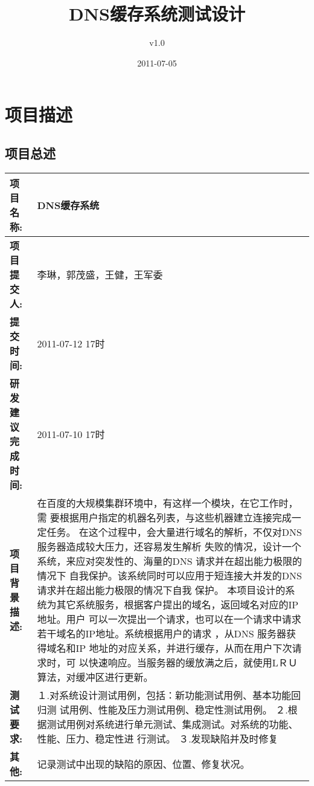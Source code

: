 \documentclass[12pt, a4paper, titlepage]{article}
\title{DNS缓存系统测试设计}
\author{v1.0}
\date{2011-07-05}
\begin{document}
\maketitle


\newpage
{}%


\tableofcontents
\newpage
{}

\section{项目描述}
\subsection{项目总述}
\begin{table}[H]
\centering
\begin{tabular}{|p{5em}|p{25em}|}
\hline
\textbf{项目名称:}&DNS缓存系统\\
\hline
\textbf{项目提交人:}&李琳，郭茂盛，王健，王军委\\
\hline
\textbf{提交时间:}& 2011-07-12 17时\\
\hline
\textbf{研发建议完成时间:}&2011-07-10 17时\\
\hline
\textbf{项目背景描述:}&{在百度的大规模集群环境中，有这样一个模块，在它工作时，需
要根据用户指定的机器名列表，与这些机器建立连接完成一定任务。
在这个过程中，会大量进行域名的解析，不仅对DNS 服务器造成较大压力，还容易发生解析
失败的情况，设计一个系统，来应对突发性的、海量的DNS 请求并在超出能力极限的情况下
自我保护。该系统同时可以应用于短连接大并发的DNS 请求并在超出能力极限的情况下自我
保护。
本项目设计的系统为其它系统服务，根据客户提出的域名，返回域名对应的IP 地址。用户
可以一次提出一个请求，也可以在一个请求中请求若干域名的IP地址。系统根据用户的请求
，从DNS 服务器获得域名和IP 地址的对应关系，并进行缓存，从而在用户下次请求时，可
以快速响应。当服务器的缓放满之后，就使用LＲＵ算法，对缓冲区进行更新。}\\
\hline
\textbf{测试要求:}& １.对系统设计测试用例，包括：新功能测试用例、基本功能回归测
试用例、性能及压力测试用例、稳定性测试用例。
２.根据测试用例对系统进行单元测试、集成测试。对系统的功能、性能、压力、稳定性进
行测试。
３.发现缺陷并及时修复\\
\hline
\textbf{其他:}& 记录测试中出现的缺陷的原因、位置、修复状况。\\
\hline
\end{tabular}
\end{table}





\end{document}
